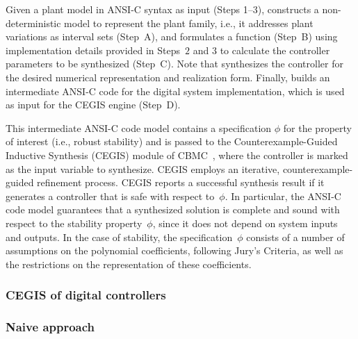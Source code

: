 \documentclass[twocolumn]{autart}    %
\begin{document}
Given a plant model in ANSI-C syntax as input (Steps 1--3), \tool constructs
a non-deterministic model to represent the plant family, i.e., it addresses
plant variations as interval sets (Step~A), and formulates a function
(Step~B) using implementation details provided in Steps~$2$ and $3$ to
calculate the controller parameters to be synthesized (Step~C).  Note that
\tool synthesizes the controller for the desired numerical representation
and realization form.  Finally, \tool builds an intermediate ANSI-C code for
the digital system implementation, which is used as input for the CEGIS
engine (Step~D).

This intermediate ANSI-C code model contains a specification $\phi$ for the
property of interest (i.e., robust stability) and is passed to the
Counterexample-Guided Inductive Synthesis (CEGIS) module of
CBMC~\cite{ClarkeKL04}, where the controller is marked as the input variable
to synthesize.  CEGIS employs an iterative, counterexample-guided refinement
process.%
CEGIS reports a successful synthesis result if it generates a controller
that is safe with respect to~$\phi$.  In particular, the ANSI-C code model
guarantees that a synthesized solution is complete and sound with respect to
the stability property~$\phi$, since it does not depend on system inputs and
outputs.  In the case of stability, the specification~$\phi$ consists of a
number of assumptions on the polynomial coefficients, following Jury's
Criteria, as well as the restrictions on the representation of these
coefficients.%

\subsubsection{CEGIS of digital controllers} 
\label{sssec:cegisdig}

\subsubsection{Naive approach} 
\label{sssec:naive}
\end{document}
